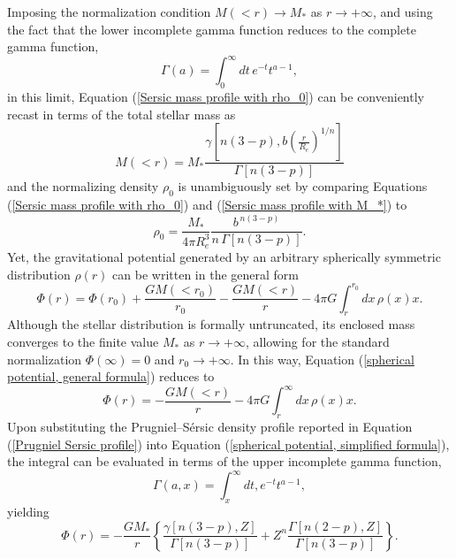 \documentclass[12pt,twoside,openany]{book}
\begin{document}
Imposing the normalization condition $M(<r)\rightarrow M_*$ as $r\rightarrow+\infty$, and using the fact that the lower incomplete gamma function reduces to the complete gamma function,
\begin{equation}\label{complete gamma fun}
    \Gamma(a)=\int_{0}^{\infty}dt\, e^{-t}t^{a-1},
\end{equation}
in this limit, Equation (\ref{Sersic mass profile with rho_0}) can be conveniently recast in terms of the total stellar mass as
\begin{equation}\label{Sersic mass profile with M_*}
M(<r)=M_*\frac{\gamma\left[n(3-p),b\left(\frac{r}{R_e}\right)^ {1/n}\right]}{\Gamma[n(3-p)]}
\end{equation}
and the normalizing density $\rho_0$ is unambiguously set by comparing Equations (\ref{Sersic mass profile with rho_0}) and (\ref{Sersic mass profile with M_*}) to
\begin{equation}
\label{Sersic profile rho_0}
\rho_0
=
\frac{M_*}{4\pi R_e^3}
\frac{b^{\,n(3-p)}}{n\,\Gamma\!\left[n(3-p)\right]}.
\end{equation}
Yet, the gravitational potential generated by an arbitrary spherically symmetric distribution $\rho(r)$ can  be written in the general form
\begin{equation}\label{spherical potential, general formula}
\Phi(r)=\Phi(r_0)+\frac{GM(<r_0)}{r_0}-\frac{GM(<r)}{r}-4\pi G \int_{r}^{r_0}dx\,\rho(x)x.
\end{equation}
Although the stellar distribution is formally untruncated, its enclosed mass converges to the finite value $M_*$ as $r\rightarrow+\infty$, allowing for the standard normalization $\Phi(\infty)=0$ and $r_0\rightarrow+\infty$. In this way, Equation (\ref{spherical potential, general formula}) reduces to
\begin{equation}\label{spherical potential, simplified formula}
\Phi(r)=-\frac{GM(<r)}{r}-4\pi G \int_{r}^{\infty}dx\,\rho(x)x.
\end{equation}
Upon substituting the Prugniel--Sérsic density profile reported in Equation (\ref{Prugniel Sersic profile}) into Equation (\ref{spherical potential, simplified formula}), the integral can be evaluated in terms of the upper incomplete gamma function,
\begin{equation}\label{upper incomplete gamma fun}
\Gamma(a,x)=\int_{x}^{\infty}dt,e^{-t}t^{a-1},
\end{equation}
yielding
\begin{equation}
    \Phi(r)=-\frac{GM_*}{r}
    \left\{
        \frac{\gamma\left[n(3-p),Z\right]}{\Gamma\left[n(3-p)\right]}
        +Z^n\frac{\Gamma\left[n(2-p),Z\right]}{\Gamma\left[n(3-p)\right]}
    \right\}.
\end{equation}
\end{document}
